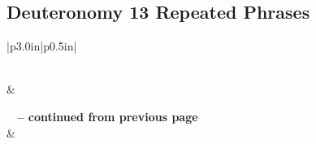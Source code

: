 \subsection{Deuteronomy 13 Repeated Phrases}


\normalsize
 
\begin{center}
\begin{longtable}{|p{3.0in}|p{0.5in}|}
\caption[Deuteronomy 13 Repeated Phrases]{Deuteronomy13 Repeated Phrases}\label{table:Repeated Phrases Deuteronomy 13} \\
\hline {} &  \\ \hline 
\endfirsthead
 
{{\bfseries \tablename\ \thetable{} -- continued from previous page}} \\  
\hline {} &  \\ \hline 
\endhead
 

\end{longtable}
\end{center}
